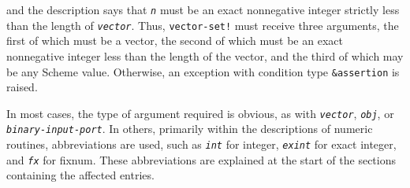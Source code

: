 and the description says that
\texttt{\textit{n}} must be an exact nonnegative integer strictly less than
the length of \texttt{\textit{vector}}.
Thus, \texttt{vector-set!} must receive three arguments, the first
of which must be a vector, the second of which must be an exact nonnegative
integer less than the length of the vector, and the third of which may
be any Scheme value.
Otherwise, an exception with condition type \texttt{\&{}assertion} is
raised.


In most cases, the type of argument required is obvious, as with
\texttt{\textit{vector}}, \texttt{\textit{obj}}, or \texttt{\textit{binary-input-port}}.
In others, primarily within the descriptions of numeric routines,
abbreviations are used, such as \texttt{\textit{int}} for integer, \texttt{\textit{exint}}
for exact integer, and \texttt{\textit{fx}} for fixnum.
These abbreviations are explained at the start of the sections
containing the affected entries.



